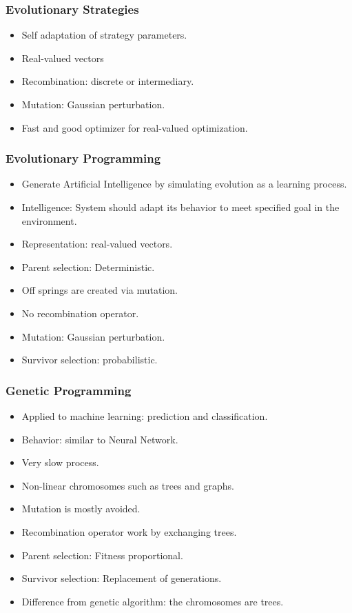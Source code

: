 \frame
{
	\frametitle{Evolutionary Strategies}

	\begin{itemize}
		\item Self adaptation of strategy parameters.
		\item Real-valued vectors
		\item Recombination: discrete or intermediary.
		\item Mutation: Gaussian perturbation.
		\item Fast and good optimizer for real-valued optimization.
	\end{itemize}
}

\frame
{
	\frametitle{Evolutionary Programming}

	\begin{itemize}
		\item Generate Artificial Intelligence by simulating evolution as a learning process.
		\item Intelligence: System should adapt its behavior to meet specified goal in the environment.
		\item Representation: real-valued vectors.
		\item Parent selection: Deterministic.
		\item Off springs are created via mutation.
		\item No recombination operator.
		\item Mutation: Gaussian perturbation.
		\item Survivor selection: probabilistic.
	\end{itemize}
}

\frame
{
	\frametitle{Genetic Programming}

	\begin{itemize}
		\item Applied to machine learning: prediction and classification.
		\item Behavior: similar to Neural Network.
		\item Very slow process.
		\item Non-linear chromosomes such as trees and graphs.
		\item Mutation is mostly avoided.
		\item Recombination operator work by exchanging trees.
		\item Parent selection: Fitness proportional.
		\item Survivor selection: Replacement of generations.
		\item Difference from genetic algorithm: the chromosomes are trees.
	\end{itemize}
}

